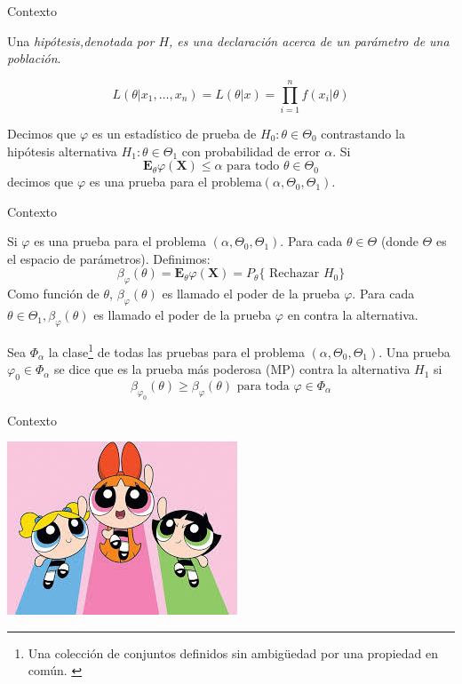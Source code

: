 \documentclass{beamer}
\begin{document}
\begin{frame}{Contexto}
 \begin{definition}
Una \textit{hipótesis,denotada por $H$, es una declaración acerca de un parámetro de una población}.
\end{definition}
\[
L(\theta | x_1, \dots, x_n)=L(\theta|x)=\prod_{i=1}^n f(x_i|\theta)
\]
\begin{definition}
Decimos que $\varphi$ es un estadístico de prueba de $H_0: \theta \in \Theta_0$ contrastando la hipótesis alternativa $H_1 :\theta \in  \Theta_1$ con probabilidad de error $\alpha$. Si 
\[
\mathbf{E}_\theta \varphi(\mathbf{X}) \leq \alpha \textrm{  para todo  }\theta \in \Theta_0
\]
decimos que $ \varphi$ es una prueba para el problema$(\alpha, \Theta_0, \Theta_1)$.
\end{definition}
\end{frame}

\begin{frame}{Contexto}
\begin{definition}
Si $\varphi$ es una prueba para el problema $(\alpha, \Theta_0, \Theta_1)$. Para cada $\theta \in \Theta$ (donde $\Theta$ es el espacio de parámetros). Definimos:
\[
\beta_\varphi(\theta)= \mathbf{E}_\theta \varphi (\mathbf{X}) = P_\theta\{ \textrm{ Rechazar }H_0\}
\]
Como función de $\theta$, $\beta_\varphi(\theta)$ es llamado el poder de la prueba $\varphi$. Para cada $\theta \in \Theta_1, \beta_\varphi(\theta)$ es llamado el poder de la prueba $\varphi$ en contra la alternativa.
\end{definition}

\begin{definition}
Sea $\Phi_\alpha$ la clase\footnote{\small{
Una colección de conjuntos definidos sin ambigüedad por una propiedad en común.
}} 
de todas las pruebas para el problema $(\alpha, \Theta_0, \Theta_1)$. Una prueba $\varphi_0 \in \Phi_\alpha$ se dice que es la prueba más poderosa (MP) contra la alternativa $H_1$ si 
\[
\beta_{\varphi_0}(\theta) \geq \beta_\varphi(\theta) \textrm{          para toda     }  \varphi \in \Phi_\alpha
\]
\end{definition}


\end{frame}
\begin{frame}{Contexto}
\begin{center}
\includegraphics[scale= .7]{pw.jpg}
\end{center}
\end{frame}
\end{document}
